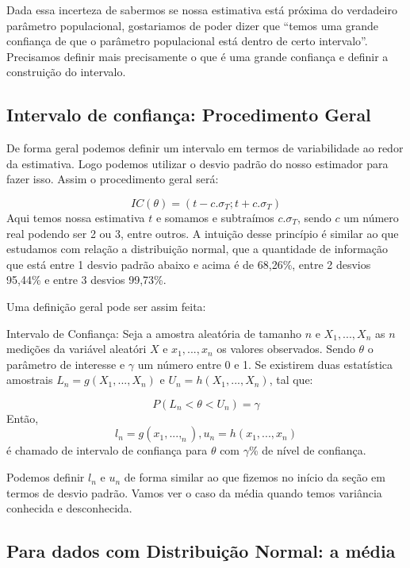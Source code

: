 \documentclass[
  letterpaper,
  DIV=11,
  numbers=noendperiod]{scrartcl}
\begin{document}
Dada essa incerteza de sabermos se nossa estimativa está próxima do
verdadeiro parâmetro populacional, gostariamos de poder dizer que
``temos uma grande confiança de que o parâmetro populacional está dentro
de certo intervalo''. Precisamos definir mais precisamente o que é uma
grande confiança e definir a construição do intervalo.

\subsection{Intervalo de confiança: Procedimento
Geral}\label{intervalo-de-confianuxe7a-procedimento-geral}

De forma geral podemos definir um intervalo em termos de variabilidade
ao redor da estimativa. Logo podemos utilizar o desvio padrão do nosso
estimador para fazer isso. Assim o procedimento geral será:

\[IC(\theta)=(t-c.\sigma_T; t+c.\sigma_T)\] Aqui temos nossa estimativa
\(t\) e somamos e subtraímos \(c.\sigma_T\), sendo \(c\) um número real
podendo ser 2 ou 3, entre outros. A intuição desse princípio é similar
ao que estudamos com relação a distribuição normal, que a quantidade de
informação que está entre 1 desvio padrão abaixo e acima é de 68,26\%,
entre 2 desvios 95,44\% e entre 3 desvios 99,73\%.

Uma definição geral pode ser assim feita:

\begin{definicao}

Intervalo de Confiança: Seja a amostra aleatória de tamanho \(n\) e
\(X_1,...,X_n\) as \(n\) medições da variável aleatóri \(X\) e
\(x_1,..., x_n\) os valores observados. Sendo \(\theta\) o parâmetro de
interesse e \(\gamma\) um número entre 0 e 1. Se existirem duas
estatística amostrais \(L_n=g(X_1,...,X_n)\) e \(U_n=h(X_1,...,X_n)\),
tal que:

\[P(L_n<\theta<U_n)=\gamma\] Então,
\[l_n=g(x_1,...,_n),u_n=h(x_1,...,x_n)\] é chamado de intervalo de
confiança para \(\theta\) com \(\gamma\)\% de nível de confiança.

\end{definicao}

Podemos definir \(l_n\) e \(u_n\) de forma similar ao que fizemos no
início da seção em termos de desvio padrão. Vamos ver o caso da média
quando temos variância conhecida e desconhecida.

\subsection{Para dados com Distribuição Normal: a
média}\label{para-dados-com-distribuiuxe7uxe3o-normal-a-muxe9dia}
\end{document}
